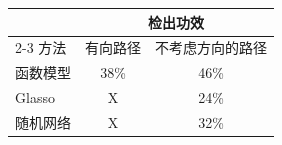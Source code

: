 \begin{table}[htbp]
\centering
{}
\begin{tabular}{lcc}
\toprule
&\multicolumn{2}{c}{检出功效}\\
\cmidrule(lr){2-3}
方法&有向路径&不考虑方向的路径\\
\midrule
函数模型&38\%&46\%\\
Glasso&X&24\%\\
随机网络&X&32\%\\
\bottomrule
\end{tabular}
\end{table}

